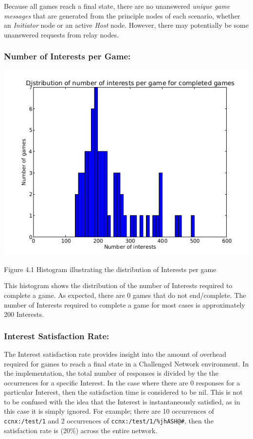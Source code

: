 \documentclass[a4paper,12pt]{report}      %
\begin{document}
Because all games reach a final state, there are no unanswered \textsl{unique game messages} that are generated
from the principle nodes of each scenario, whether an \emph{Initiator} node or an active \emph{Host} node. However,
there may potentially be some unanswered requests from relay nodes.

\subsubsection{Number of Interests per Game:}

\includegraphics[scale=0.73]{InterestsPerGameHist.jpg}

\begin{center}Figure 4.1 Histogram illustrating the distribution of Interests per game\end{center}

This histogram shows the distribution of the number of Interests required to complete a game. As
expected, there are 0 games that do not end/complete. The number of Interests required to complete a game
for most cases is approximately 200 Interests.

\subsubsection{Interest Satisfaction Rate:}

The Interest satisfaction rate provides insight into the amount of overhead required for games to reach a final state in a Challenged Network environment. In the implementation, the total number of responses is divided by the the occurrences for a specific Interest. In the case where there are 0 responses for a particular Interest, then the satisfaction time is considered to be nil. This is not to be confused with the idea that the Interest is instantaneously satisfied, as in this case it is simply ignored. For example; there are 10 occurrences of \verb!ccnx:/test/1! and 2 occurrences of \verb!ccnx:/test/1/%jhASH@#!, then the satisfaction rate is (20\%) across the entire network.
\end{document}
